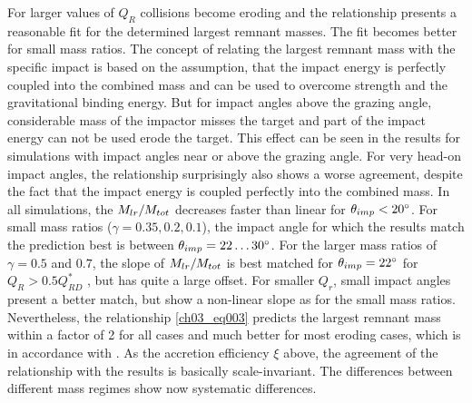 For larger values of $Q_R$ collisions become eroding and the relationship presents a reasonable fit for the determined largest remnant masses. The fit becomes better for small mass ratios. The concept of relating the largest remnant mass with the specific impact is based on the assumption, that the impact energy is perfectly coupled into the combined mass and can be used to overcome strength and the gravitational binding energy. But for impact angles above the grazing angle, considerable mass of the impactor misses the target and part of the impact energy can not be used erode the target. This effect can be seen in the results for simulations with impact angles near or above the grazing angle. For very head-on impact angles, the relationship surprisingly also shows a worse agreement, despite the fact that the impact energy is coupled perfectly into the combined mass. In all simulations, the $M_{lr} / M_{tot}$ decreases faster than linear for $\theta_{imp} < 20 ^\circ$. For small mass ratios ($\gamma = 0.35, 0.2, 0.1$), the impact angle for which the results match the prediction best is between $\theta_{imp} = 22 \dots 30 ^\circ$. For the larger mass ratios of $\gamma = 0.5$ and $0.7$, the slope of $M_{lr} / M_{tot}$ is best matched for $\theta_{imp} = 22 ^\circ$ for $Q_R > 0.5 Q^*_{RD}$ , but has quite a large offset. For smaller $Q_r$, small impact angles present a better match, but show a non-linear slope as for the small mass ratios. Nevertheless, the relationship \ref{ch03_eq003} predicts the largest remnant mass within a factor of 2 for all cases and much better for most eroding cases, which is in accordance with \cite{2009ApJ...700L.118M}. As the accretion efficiency $\xi$ above, the agreement of the relationship with the results is basically scale-invariant. The differences between different mass regimes show now systematic differences.

